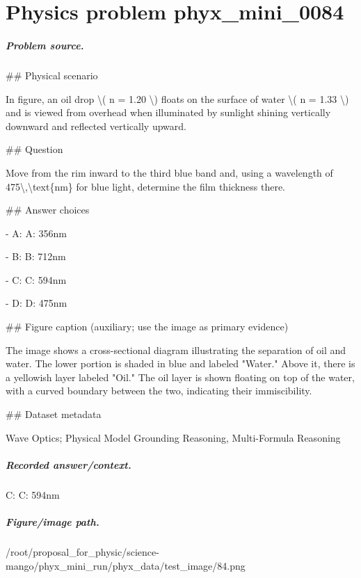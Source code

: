 
\chapter{Physics problem phyx\_mini\_0084}
\label{ch:PhyXMiniProblems_problem_phyx_mini_0084}

\paragraph{Problem source.}
\#\# Physical scenario

In figure, an oil drop \textbackslash{}( n = 1.20 \textbackslash{}) floats on the surface of water \textbackslash{}( n = 1.33 \textbackslash{}) and is viewed from overhead when illuminated by sunlight shining vertically downward and reflected vertically upward.

\#\# Question

Move from the rim inward to the third blue band and, using a wavelength of 475\textbackslash{},\textbackslash{}text\{nm\} for blue light, determine the film thickness there.

\#\# Answer choices

- A: A: 356nm

- B: B: 712nm

- C: C: 594nm

- D: D: 475nm

\#\# Figure caption (auxiliary; use the image as primary evidence)

The image shows a cross-sectional diagram illustrating the separation of oil and water. The lower portion is shaded in blue and labeled "Water." Above it, there is a yellowish layer labeled "Oil." The oil layer is shown floating on top of the water, with a curved boundary between the two, indicating their immiscibility.

\#\# Dataset metadata

Wave Optics; Physical Model Grounding Reasoning, Multi-Formula Reasoning

\paragraph{Recorded answer/context.}
C: C: 594nm

\paragraph{Figure/image path.}
/root/proposal\_for\_physic/science-mango/phyx\_mini\_run/phyx\_data/test\_image/84.png

